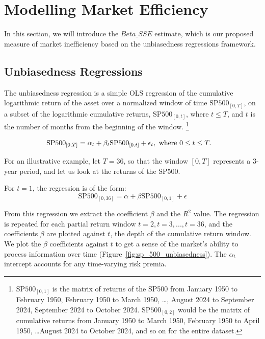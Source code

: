 \section{Modelling Market Efficiency}
\label{sec:market_efficiency}

In this section, we will introduce the $Beta\_SSE$ estimate, which is our proposed measure of market inefficiency based on the unbiasedness regressions framework.

\subsection{Unbiasedness Regressions}

\noindent The unbiasedness regression is a simple OLS regression of the cumulative logarithmic return of the asset over a normalized window of time $\mathrm{SP500}_{[0, T]}$, on a subset of the
logarithmic cumulative returns, $\mathrm{SP500}_{[0, t]}$, where $t \leq T$, and $t$ is the number of months from the beginning of the window.
 \footnote{$\mathrm{SP500}_{[0, 1]}$ is the matrix of returns of the SP500 from January 1950 to February 1950, February 1950 to March 1950, \dots, August 2024 to September 2024, September 2024 to October 2024.\newline
$\mathrm{SP500}_{[0, 2]}$ would be the matrix of cumulative returns from January 1950 to March 1950, February 1950 to April 1950, \dots August 2024 to October 2024, and so on for the entire dataset.}

\begin{equation}
    \begin{aligned}
        \mathrm{SP500}_{[0, T]} &= \alpha_t + \beta_t \mathrm{SP500}_{[0, t]} + \epsilon_{t}, \hfill \text{   where } 0 \leq t \leq T.
    \end{aligned}
\end{equation}

\noindent For an illustrative example, let $T = 36$, so that the window $[0, T]$ represents a 3-year period, and let us look at the returns of the SP500.

\noindent For $t=1$, the regression is of the form:
\begin{equation}
    \mathrm{SP500}_{[0, 36]} = \alpha + \beta \mathrm{SP500}_{[0, 1]} + \epsilon
\end{equation}

\noindent From this regression we extract the coefficient $\beta$ and the $R^2$ value.
The regression is repeated for each partial return window $t=2, t=3, ..., t=36$, and the coefficients $\beta$ are plotted against $t$, the depth of the cumulative return window.
We plot the $\beta$ coefficients against $t$ to get a sense of the market's ability to process information over time (Figure~\ref{fig:sp_500_unbiasedness}). The $\alpha_t$ intercept
 accounts for any time-varying risk premia.


